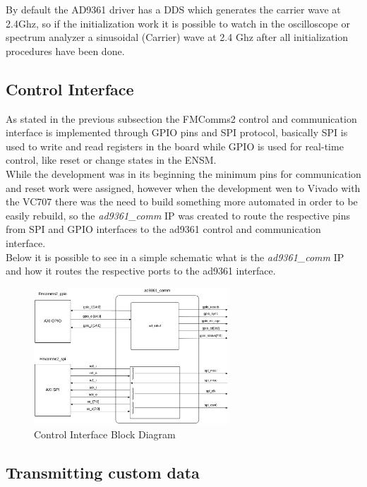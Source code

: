 By default the AD9361 driver has a DDS which generates the carrier wave at 2.4Ghz,
so if the initialization work it is possible to watch in the oscilloscope or
spectrum analyzer a sinusoidal (Carrier) wave at 2.4 Ghz after all initialization
procedures have been done.

\subsection{Control Interface}
\label{subs:controlif}

As stated in the previous subsection the FMComms2 control and communication
interface is implemented through GPIO pins and SPI protocol, basically SPI is
used to write and read registers in the board while GPIO is used for real-time
control, like reset or change states in the ENSM.\\

While the development was in its beginning the minimum pins for communication
and reset work were assigned, however when the development wen to Vivado with
the VC707 there was the need to build something more automated in order to be
easily rebuild, so the \emph{ad9361\_comm} IP was created to route the respective
pins from SPI and GPIO interfaces to the ad9361 control and communication interface.\\

Below it is possible to see in a simple schematic what is the \emph{ad9361\_comm}
IP and how it routes the respective ports to the ad9361 interface.

\begin{figure}[htbp]
    \centering
    \includegraphics[width=0.65\textwidth]{./figures/comm_if}
    \caption{ Control Interface Block Diagram
    \label{fig:commif}}
\end{figure}

\subsection{Transmitting custom data}

